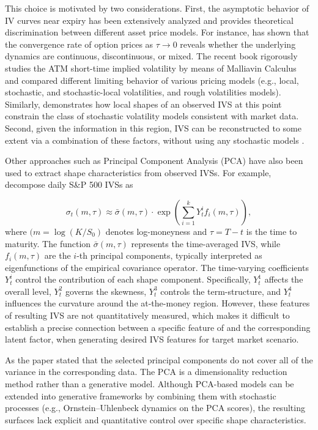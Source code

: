 \documentclass{article}
\begin{document}
This choice is motivated by two considerations. First, the asymptotic behavior of IV curves near expiry has been extensively analyzed and provides theoretical discrimination between different asset price models. For instance, \citep{carr2003type} has shown that the convergence rate of option prices as $\tau \to 0$ reveals whether the underlying dynamics are continuous, discontinuous, or mixed. The recent book \citep{ait2021implied} rigorously studies   the ATM short-time  implied volatility by means of Malliavin Calculus  and compared different limiting behavior of various pricing models (e.g.,  local, stochastic, and stochastic-local volatilities,  and  rough volatilities models). Similarly, \citep{AITSAHALIA2021364} demonstrates how local shapes of an observed IVS at this point constrain the class of stochastic volatility models consistent with market data.   Second, given the information in this region, IVS  can be  reconstructed to some extent via a  combination of these factors,   without using any stochastic models \citep{franccois2022venturing}.



Other approaches such as Principal Component Analysis (PCA) have also been used to extract shape characteristics  from observed IVSs. For example, \cite{Cont04032023} decompose daily S\&P 500 IVSs as

\begin{equation*}
    \sigma_t(m, \tau) \approx \bar{\sigma}(m, \tau) \cdot \exp\left( \sum_{i=1}^k Y_t^i f_i(m, \tau) \right),
\end{equation*}
where $( m = \log(K/S_0) $ denotes log-moneyness and $ \tau = T - t $ is the time to maturity. The function $ \bar{\sigma}(m, \tau) $ represents the time-averaged IVS, while $ f_i(m, \tau) $ are the $i$-th principal components, typically interpreted as eigenfunctions of the empirical covariance operator. The time-varying coefficients $ Y_t^i $ control the contribution of each shape component. Specifically, $ Y_t^1 $ affects the overall level, $ Y_t^2 $ governs the skewness, $ Y_t^3 $ controls the term-structure, and $ Y_t^4 $ influences the curvature around the at-the-money region. However, these features of resulting IVS  are not quantitatively measured, which makes it difficult to establish a precise  connection  between a  specific feature  of  and the corresponding latent factor, when generating  desired IVS features for target market scenario.  



As the paper \citep{Cont04032023} stated that the selected  principal components do not cover all of the variance in the corresponding data. The PCA is a dimensionality reduction method rather than a generative model. Although PCA-based models can be extended into generative frameworks by combining them with stochastic processes (e.g., Ornstein–Uhlenbeck dynamics on the PCA scores), the resulting surfaces  lack explicit and quantitative control over specific shape characteristics.
\end{document}
